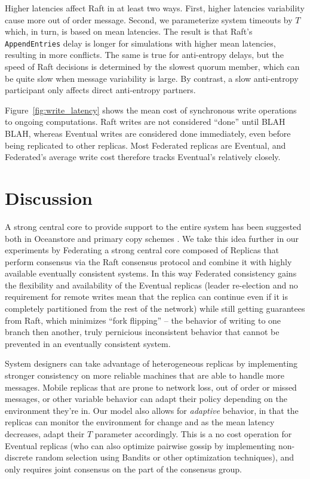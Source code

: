 \documentclass[10pt,conference,letterpaper]{IEEEtran}
\begin{document}
Higher latencies affect Raft in at least two ways. First, higher latencies
variability cause more out of order message. Second, we parameterize system
timeouts by $T$ which, in turn, is based on mean latencies.
The result is that Raft's \texttt{AppendEntries} delay is longer for
simulations with higher mean latencies, resulting in more conflicts.
The same is true for anti-entropy delays, but the speed of Raft decisions is
determined by the slowest quorum member, which can be quite slow when message
variability is large. By contrast, a slow anti-entropy participant only
affects direct anti-entropy partners.

Figure~\ref{fig:write_latency} shows the mean cost of synchronous write operations to
ongoing computations. Raft writes are not considered ``done'' until BLAH BLAH,
whereas Eventual writes are considered done immediately, even before being
replicated to other replicas.
Most Federated replicas are Eventual, and Federated's average write cost
therefore tracks Eventual's relatively closely.

\section{Discussion}

A strong central core to provide support to the entire system has been suggested both in Oceanstore \cite{kubiatowicz_oceanstore:_2000} and primary copy schemes \cite{gray_dangers_1996}. We take this idea further in our experiments by Federating a strong central core composed of Replicas that perform consensus via the Raft consensus protocol and combine it with highly available eventually consistent systems. In this way Federated consistency gains the flexibility and availability of the Eventual replicas (leader re-election and no requirement for remote writes mean that the replica can continue even if it is completely partitioned from the rest of the network) while still getting guarantees from Raft, which minimizes ``fork flipping'' -- the behavior of writing to one branch then another, truly pernicious inconsistent behavior that cannot be prevented in an eventually consistent system.

System designers can take advantage of heterogeneous replicas by implementing stronger consistency on more reliable machines that are able to handle more messages. Mobile replicas that are prone to network loss, out of order or missed messages, or other variable behavior can adapt their policy depending on the environment they're in. Our model also allows for \textit{adaptive} behavior, in that the replicas can monitor the environment for change and as the mean latency decreases, adapt their $T$ parameter accordingly. This is a no cost operation for Eventual replicas (who can also optimize pairwise gossip by implementing non-discrete random selection using Bandits or other optimization techniques), and only requires joint consensus on the part of the consensus group.
\end{document}
